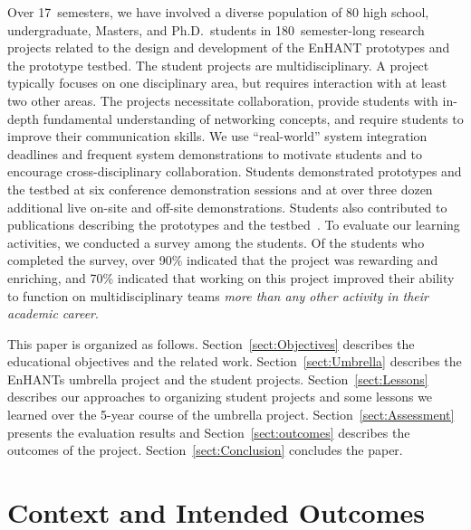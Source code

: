 \documentclass[journal,twopages]{IEEEtran}
\newcommand{\makered}[1]{\color{black}#1\color{black}}
\begin{document}
Over 17~semesters, we have involved a diverse population of 80 high school, undergraduate, Masters, and Ph.D.~students in 180~semester-long research projects related to the design and development of the EnHANT prototypes and the prototype testbed.
The student projects are multidisciplinary. A project typically focuses on one disciplinary area, but requires interaction with at least two other areas. The projects necessitate collaboration, provide students with in-depth fundamental understanding of networking concepts, and require students to improve their communication skills. We use ``real-world'' system integration deadlines and frequent system demonstrations to motivate students and to encourage cross-disciplinary collaboration. Students demonstrated prototypes and the testbed at six conference demonstration sessions \cite{SeconDemoEnHANTs2010,MobiComDemo,SenSys2011Demo,MobiSys2011Demo,IDTechDemo2012,Margolies2013Demo} and at over three dozen additional live on-site and off-site demonstrations.
\makered{Students also contributed to publications describing the prototypes and the testbed~\cite{Gorlatova2013Prototyping,Gorlatova_EnHANTS_TOSN}.}
To evaluate our learning activities, we conducted a survey among the students.
Of the students who completed the survey, over 90\% indicated that the project was rewarding and enriching, and 70\% indicated that working on this project improved their ability to function on multidisciplinary teams \emph{more than any other activity in their academic career}.

This paper is organized as follows. Section~\ref{sect:Objectives} describes the
educational objectives and the related work.
Section~\ref{sect:Umbrella} describes the EnHANTs umbrella project and the student projects. Section~\ref{sect:Lessons} describes our approaches to organizing student projects and some lessons we learned over the 5-year course of the umbrella project.
Section~\ref{sect:Assessment} presents the evaluation results and Section~\ref{sect:outcomes} describes the outcomes of the project. Section~\ref{sect:Conclusion} concludes the paper.










 

\section{Context and Intended Outcomes}
\end{document}
